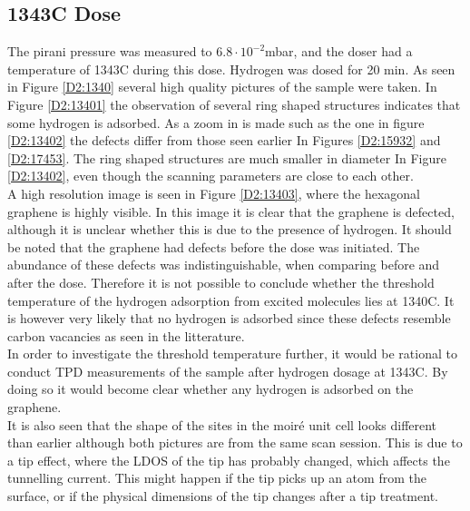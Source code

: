 \subsection{1343\degree C Dose}

The pirani pressure was measured to $6.8 \cdot 10^{-2}$mbar, and the doser had a temperature of 1343\degree C during this dose. Hydrogen was dosed for 20 min. As seen in Figure \ref{D2:1340} several high quality pictures of the sample were taken. In Figure \ref{D2:13401} the observation of several ring shaped structures indicates that some hydrogen is adsorbed. As a zoom in is made such as the one in figure \ref{D2:13402} the defects differ from those seen earlier In Figures \ref{D2:15932} and \ref{D2:17453}. The ring shaped structures are much smaller in diameter In Figure \ref{D2:13402}, even though the scanning parameters are close to each other.\\
A high resolution image is seen in Figure \ref{D2:13403}, where the hexagonal graphene is highly visible. In this image it is clear that the graphene is defected, although it is unclear whether this is due to the presence of hydrogen. It should be noted that the graphene had defects before the dose was initiated. The abundance of these defects was indistinguishable, when comparing before and after the dose. Therefore it is not possible to conclude whether the threshold temperature of the hydrogen adsorption from excited molecules lies at 1340\degree C. It is however very likely that no hydrogen is adsorbed since these defects resemble carbon vacancies as seen in the litterature.\cite{1367-2630-11-2-023006}\\
In order to investigate the threshold temperature further, it would be rational to conduct TPD measurements of the sample after hydrogen dosage at 1343\degree C. By doing so it would become clear whether any hydrogen is adsorbed on the graphene. \\
 It is also seen that the shape of the sites in the moiré unit cell looks different than earlier although both pictures are from the same scan session. This is due to a tip effect, where the LDOS of the tip has probably changed, which affects the tunnelling current. This  might happen if the tip picks up an atom from the surface, or if the physical dimensions of the tip changes after a tip treatment.


